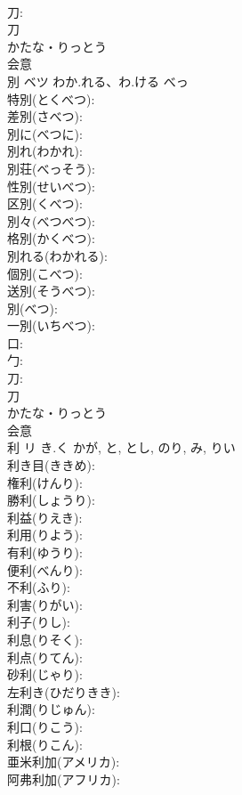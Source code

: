 \documentclass[8pt]{extreport}
\begin{document}
\begin{CJK}{UTF8}{min}
\\	刀: 
\\	刀	
\\	かたな・りっとう	
\\	会意 
\\	別	ベツ	わか.れる、わ.ける	べっ	
\\	特別(とくべつ): 
\\	差別(さべつ): 
\\	別に(べつに): 
\\	別れ(わかれ): 
\\	別荘(べっそう): 
\\	性別(せいべつ): 
\\	区別(くべつ): 
\\	別々(べつべつ): 
\\	格別(かくべつ): 
\\	別れる(わかれる): 
\\	個別(こべつ): 
\\	送別(そうべつ): 
\\	別(べつ): 
\\	一別(いちべつ): 
\\	口: 
\\	勹: 
\\	刀: 
\\	刀	
\\	かたな・りっとう	
\\	会意 
\\	利	リ	き.く	かが, と, とし, のり, み, りい	
\\	利き目(ききめ): 
\\	権利(けんり): 
\\	勝利(しょうり): 
\\	利益(りえき): 
\\	利用(りよう): 
\\	有利(ゆうり): 
\\	便利(べんり): 
\\	不利(ふり): 
\\	利害(りがい): 
\\	利子(りし): 
\\	利息(りそく): 
\\	利点(りてん): 
\\	砂利(じゃり): 
\\	左利き(ひだりきき): 
\\	利潤(りじゅん): 
\\	利口(りこう): 
\\	利根(りこん): 
\\	亜米利加(アメリカ): 
\\	阿弗利加(アフリカ): 

\end{CJK}
\end{document}
